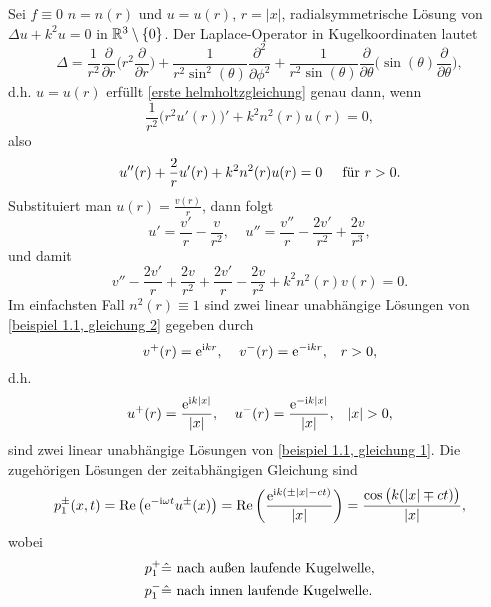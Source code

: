 \begin{bsp}\label{kapitel 1 erstes beispiel}
	Sei \(f\equiv0\) \(n=n(r)\) und \(u=u(r)\), \(r=|x|\), radialsymmetrische Lösung von \(\Delta u+k^2u=0\) in \(\mathbb{R}^3\setminus\{0\}\). Der Laplace-Operator in Kugelkoordinaten lautet
	\begin{equation*}
		\Delta=\frac{1}{r^2}\frac{\partial}{\partial r}\Big(r^2\frac{\partial }{\partial r}\Big)+\frac{1}{r^2\sin^2(\theta)}\frac{\partial^2}{\partial \phi^2}+\frac{1}{r^2\sin(\theta)}\frac{\partial}{\partial \theta}\Big(\sin(\theta)\frac{\partial }{\partial \theta}\Big),
	\end{equation*}
	d.h. \(u=u(r)\) erfüllt \eqref{erste helmholtzgleichung} genau dann, wenn
	\begin{equation*}
		\frac{1}{r^2}\big(r^2u'(r)\big)'+k^2n^2(r)u(r)=0,
	\end{equation*}
	also
	\begin{equation}
		\label{beispiel 1.1, gleichung 1}
		u''(r)+\frac{2}{r}u'(r)+k^2n^2(r)u(r)=0\;\;\;\;\text{ für }r>0.
	\end{equation}
	Substituiert man \(u(r)=\frac{v(r)}{r}\), dann folgt
	\begin{equation*}
		u'=\frac{v'}{r}-\frac{v}{r^2},\;\;\;\;u''=\frac{v''}{r}-\frac{2v'}{r^2}+\frac{2v}{r^3},
	\end{equation*}
	und damit
	\begin{equation}
		\label{beispiel 1.1, gleichung 2}
		v''-\frac{2v'}{r}+\frac{2v}{r^2}+\frac{2v'}{r}-\frac{2v}{r^2}+k^2n^2(r)v(r)=0.
	\end{equation}
	Im einfachsten Fall \(n^2(r)\equiv1\) sind zwei linear unabhängige Lösungen von \eqref{beispiel 1.1, gleichung 2} gegeben durch
	\begin{equation*}
		v^+(r)=\mathrm{e}^{\mathrm{i} kr},\;\;\;\;v^-(r)=\mathrm{e}^{-\mathrm{i} kr},\;\;\;r>0,
	\end{equation*}
	d.h.
	\begin{equation*}
		u^+(r)=\frac{\e^{\ii k|x|}}{|x|},\;\;\;\;u^-(r)=\frac{\e^{-\ii k|x|}}{|x|},\;\;\;|x|>0,
	\end{equation*}
	sind zwei linear unabhängige Lösungen von \eqref{beispiel 1.1, gleichung 1}. Die zugehörigen Lösungen der zeitabhängigen Gleichung sind
	\begin{equation*}
		p_1^\pm(x,t)=\operatorname{Re}\big(\mathrm{e}^{-\mathrm{i}\omega t}u^\pm(x)\big)=\operatorname{Re}\left(\frac{\mathrm{e}^{\mathrm{i} k(\pm|x|-ct)}}{|x|}\right)=\frac{\cos\big(k(|x|\mp ct)\big)}{|x|},
	\end{equation*}
	wobei
	\begin{equation*}
		\begin{aligned}
			p_1^+&\hat{=}\text{ nach außen laufende Kugelwelle,}\\
			p_1^-&\hat{=}\text{ nach innen laufende Kugelwelle.}
		\end{aligned}
	\end{equation*}\vspace{3cm}
	

\end{bsp}
